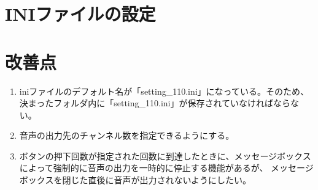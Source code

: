 \documentclass{article} %
\begin{document}
\section{INIファイルの設定}

\section{改善点}
\begin{enumerate}
  \item iniファイルのデフォルト名が「setting\_110.ini」になっている。そのため、決まったフォルダ内に「setting\_110.ini」が保存されていなければならない。
  \item 音声の出力先のチャンネル数を指定できるようにする。
  \item ボタンの押下回数が指定された回数に到達したときに、メッセージボックスによって強制的に音声の出力を一時的に停止する機能があるが、
  メッセージボックスを閉じた直後に音声が出力されないようにしたい。
\end{enumerate}
\end{document}
